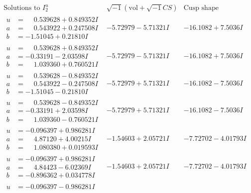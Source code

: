 \documentclass[1p]{elsarticle_modified}
\theoremstyle{definition}
\newcommand{\I}{\sqrt{-1}}
\begin{document}
$$\begin{array}{c|c|c}  
\text{Solutions to }I^u_{2}& \I (\text{vol} + \sqrt{-1}CS) & \text{Cusp shape}\\
 \hline 
\begin{aligned}
u &= \phantom{-}0.539628 + 0.849352 I \\
a &= \phantom{-}0.543922 + 0.247508 I \\
b &= -1.51045 + 0.21810 I\end{aligned}
 & -5.72979 - 5.71321 I & -16.1082 + 7.5036 I \\ \hline\begin{aligned}
u &= \phantom{-}0.539628 + 0.849352 I \\
a &= -0.33191 - 2.03598 I \\
b &= \phantom{-}1.039360 + 0.760521 I\end{aligned}
 & -5.72979 - 5.71321 I & -16.1082 + 7.5036 I \\ \hline\begin{aligned}
u &= \phantom{-}0.539628 - 0.849352 I \\
a &= \phantom{-}0.543922 - 0.247508 I \\
b &= -1.51045 - 0.21810 I\end{aligned}
 & -5.72979 + 5.71321 I & -16.1082 - 7.5036 I \\ \hline\begin{aligned}
u &= \phantom{-}0.539628 - 0.849352 I \\
a &= -0.33191 + 2.03598 I \\
b &= \phantom{-}1.039360 - 0.760521 I\end{aligned}
 & -5.72979 + 5.71321 I & -16.1082 - 7.5036 I \\ \hline\begin{aligned}
u &= -0.096397 + 0.986281 I \\
a &= \phantom{-}4.87120 + 4.00215 I \\
b &= \phantom{-}1.080380 + 0.019593 I\end{aligned}
 & -1.54603 + 2.05721 I & -7.72702 - 4.01793 I \\ \hline\begin{aligned}
u &= -0.096397 + 0.986281 I \\
a &= \phantom{-}4.84423 - 6.02369 I \\
b &= -0.896362 + 0.034778 I\end{aligned}
 & -1.54603 + 2.05721 I & -7.72702 - 4.01793 I \\ \hline\begin{aligned}
u &= -0.096397 - 0.986281 I \\

\end{aligned}
\end{array}$$
\end{document}

